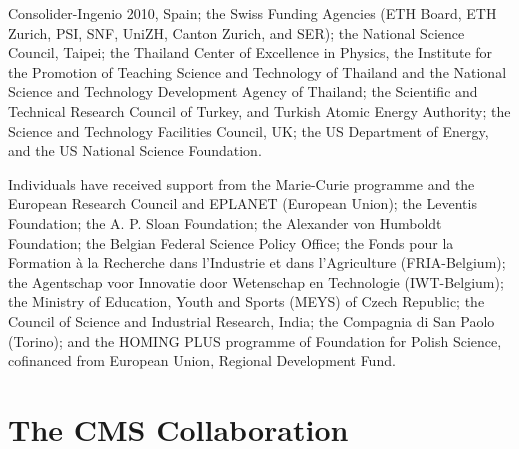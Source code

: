\documentclass[12pt,twoside,a4paper,cmspaper,final,collab]{cms-tdr}
\begin{document}
Consolider-Ingenio 2010, Spain; the Swiss Funding Agencies (ETH Board, ETH Zurich, PSI, SNF, UniZH, Canton Zurich, and SER); the National Science Council, Taipei; the Thailand Center of Excellence in Physics, the Institute for the Promotion of Teaching Science and Technology of Thailand and the National Science and Technology Development Agency of Thailand; the Scientific and Technical Research Council of Turkey, and Turkish Atomic Energy Authority; the Science and Technology Facilities Council, UK; the US Department of Energy, and the US National Science Foundation.

Individuals have received support from the Marie-Curie programme and the European Research Council and EPLANET (European Union); the Leventis Foundation; the A. P. Sloan Foundation; the Alexander von Humboldt Foundation; the Belgian Federal Science Policy Office; the Fonds pour la Formation \`a la Recherche dans l'Industrie et dans l'Agriculture (FRIA-Belgium); the Agentschap voor Innovatie door Wetenschap en Technologie (IWT-Belgium); the Ministry of Education, Youth and Sports (MEYS) of Czech Republic; the Council of Science and Industrial Research, India; the Compagnia di San Paolo (Torino); and the HOMING PLUS programme of Foundation for Polish Science, cofinanced from European Union, Regional Development Fund.




\cleardoublepage \appendix\section{The CMS Collaboration \label{app:collab}}\begin{sloppypar}\end{sloppypar}
\end{document}
